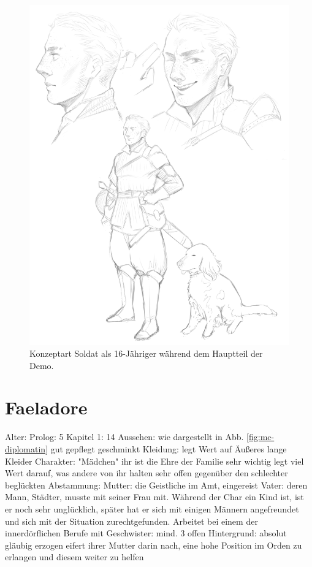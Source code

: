 \begin{figure}[tbh]
	\centering
	\includegraphics[width=0.75\textheight]{Abbildungen/Abenteuer/Hauptcharaktere/soldat.png}
	\caption[Konzeptart Soldat]{Konzeptart Soldat als 16-Jähriger während dem Hauptteil der Demo.}
	\label{fig:mc-soldat}
\end{figure}




\section{Faeladore} \label{sec:mc-diplomatin}
\begin{outline}
	\1 Alter:
		\2 Prolog: 5
		\2 Kapitel 1: 14
	\1 Aussehen:
		\2 wie dargestellt in Abb. \ref{fig:mc-diplomatin} 
		\2 gut gepflegt 
		\2 geschminkt
	\1 Kleidung:
		\2 legt Wert auf Äußeres
		\2 lange Kleider
	\1 Charakter:
		\2 "Mädchen"
		\2 ihr ist die Ehre der Familie sehr wichtig 
		\2 legt viel Wert darauf, was andere von ihr halten 
		\2 sehr offen gegenüber den schlechter beglückten
	\1 Abstammung:
		\2 Mutter: die Geistliche im Amt, eingereist
		\2 Vater: deren Mann, Städter, musste mit seiner Frau mit. Während der Char ein Kind ist, ist er noch sehr unglücklich, später hat er sich mit einigen Männern angefreundet und sich mit der Situation zurechtgefunden. Arbeitet bei einem der innerdörflichen Berufe mit
		\2 Geschwister: mind. 3 offen
	\1 Hintergrund:
		\2 absolut gläubig erzogen
		\2 eifert ihrer Mutter darin nach, eine hohe Position im Orden zu erlangen und diesem weiter zu helfen
\end{outline}

